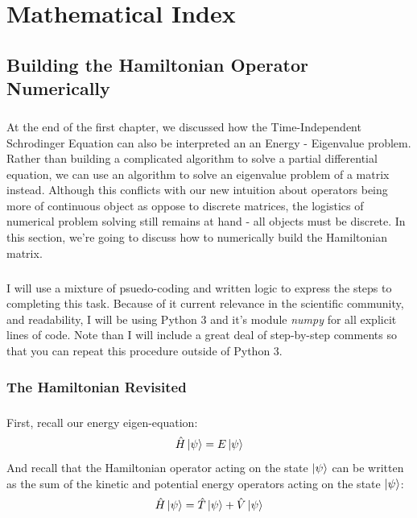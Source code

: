 \documentclass[12pt,letterpaper]{book}
\begin{document}

\chapter{Mathematical Index}



\section{Building the Hamiltonian Operator Numerically}
\paragraph*{}At the end of the first chapter, we discussed how the Time-Independent Schrodinger Equation can also be interpreted an an Energy - Eigenvalue problem. Rather than building a complicated algorithm to solve a partial differential equation, we can use an algorithm to solve an eigenvalue problem of a matrix instead. Although this conflicts with our new intuition about operators being more of continuous object as oppose to discrete matrices, the logistics of numerical problem solving still remains at hand - all objects must be discrete. In this section, we're going to discuss how to numerically build the Hamiltonian matrix.
\paragraph*{}I will use a mixture of psuedo-coding and written logic to express the steps to completing this task. Because of it current relevance in the scientific community, and readability, I will be using Python 3 and it's module \textit{numpy} for all explicit lines of code. Note than I will include a great deal of step-by-step comments so that you can repeat this procedure outside of Python 3.


\subsection*{The Hamiltonian Revisited}

\paragraph*{}First, recall our energy eigen-equation:
\begin{equation}
\label{energy-evp}
\hat{H}\ket{\psi} = E\ket{\psi}
\end{equation}
And recall that the Hamiltonian operator acting on the state $\ket{\psi}$ can be written as the sum of the kinetic and potential energy operators acting on the state $\ket{\psi}$:
\begin{equation}
\hat{H}\ket{\psi} = \hat{T}\ket{\psi} + \hat{V}\ket{\psi}
\end{equation}
\end{document}
